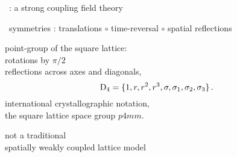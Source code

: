 \begin{frame}{\catlatt\ : a strong coupling field theory}

\begin{block}{\catlatt\ symmetries :}
translations $\circ$ time-reversal $\circ$ spatial reflections
\end{block}
point-group of the square lattice:
\\ rotations by $\pi/2$
\\ reflections across axes  and diagonals,
\[ %
\Dn{4} = \{
1, \shift, \shift^2, \shift^3,
\Refl, \Refl_{1},
\Refl_{2},\Refl_{3}
\}
\,.
\] %
international crystallographic notation,
\\
the square lattice space group $p4mm$.

\bigskip
{\color{red}not} a traditional \\
{\color{blue}spatially
weakly coupled} lattice model
\end{frame} %

